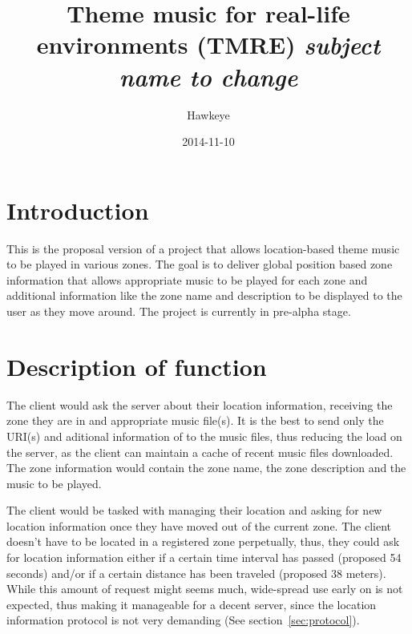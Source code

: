 \documentclass[10pt,a4paper,twocolumn,notitlepage]{article}
\author{Hawkeye}
\title{Theme music for real-life environments (TMRE) \linebreak \textit{subject name to change}}
\date{2014-11-10}
\begin{document}
\clearpage

\section{Introduction}
This is the proposal version of a project that allows location-based theme music to be played in various zones.
The goal is to deliver global position based zone information that allows appropriate music to be played for each zone and additional information like the zone name and description to be displayed to the user as they move around.
The project is currently in pre-alpha stage.

\section{Description of function}
The client would ask the server about their location information, receiving the zone they are in and appropriate music file(s). It is the best to send only the URI(s) and aditional information of to the music files, thus reducing the load on the server, as the client can maintain a cache of recent music files downloaded. The zone information would contain the zone name, the zone description and the music to be played.

The client would be tasked with managing their location and asking for new location information once they have moved out of the current zone. The client doesn't have to be located in a registered zone perpetually, thus, they could ask for location information either  if a certain time interval has passed (proposed 54 seconds) and/or if a certain distance has been traveled (proposed 38 meters).
While this amount of request might seems much, wide-spread use early on is not expected, thus making it manageable for a decent server, since the location information protocol is not very demanding (See section~\ref{sec:protocol}).
\end{document}
